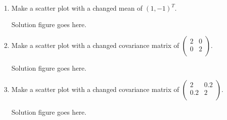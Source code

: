 \documentclass[a4paper]{article}
\theoremstyle{definition}
\newenvironment{soln}{
    \leavevmode\color{blue}\ignorespaces
}{}
\begin{document}
\begin{enumerate}
	\begin{soln}
	    Solution figure goes here.
	\end{soln}
\item Make a scatter plot with a changed mean of $(1, -1)^T$.\\
	\begin{soln}
	    Solution figure goes here.
	\end{soln}
\item Make a scatter plot with a changed covariance matrix of $\begin{pmatrix}
    2 & 0 \\ 0 & 2\\
  \end{pmatrix}$.\\
  	\begin{soln}
  	    Solution figure goes here.
	\end{soln}
\item Make a scatter plot with a changed covariance matrix of $\begin{pmatrix}
    2 & 0.2 \\ 0.2 & 2\\
  \end{pmatrix}$.\\
  	\begin{soln}
  	    Solution figure goes here.

\end{soln}
\end{enumerate}
\end{document}
